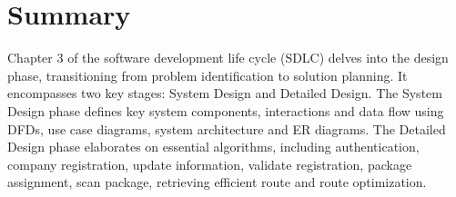 \section{Summary}
Chapter 3 of the software development life cycle (SDLC) delves into the design phase, transitioning
from problem identification to solution planning. It encompasses two key stages: System Design and
Detailed Design. The System Design phase defines key system components, interactions and data
flow using DFDs, use case diagrams, system architecture and ER diagrams. The Detailed Design
phase elaborates on essential algorithms, including authentication, company registration, update
information, validate registration, package assignment, scan package, retrieving efficient route and
route optimization.